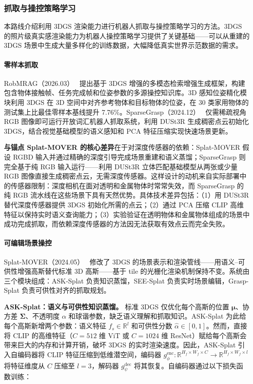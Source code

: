 \subsubsection{抓取与操控策略学习}

本路线介绍利用 3DGS 渲染能力进行机器人抓取与操控策略学习的方法。3DGS 的照片级真实感渲染能力为机器人操控策略学习提供了关键基础——可以从重建的 3DGS 场景中生成大量多样化的训练数据，大幅降低真实世界示范数据的需求。

\paragraph{零样本抓取}

RobMRAG（2026.03）~\cite{2603_00500} 提出基于 3DGS 增强的多模态检索增强生成框架，构建包含物体接触帧、任务完成帧和位姿参数的多源操控知识库。3D 感知位姿精化模块利用 3DGS 在 3D 空间中对齐参考物体和目标物体的位姿，在 30 类家用物体的测试集上比最佳零样本基线提升 7.76\%。SparseGrasp（2024.12）~\cite{2412_02140} 仅需稀疏视角 RGB 图像即可运行开放词汇机器人抓取系统，利用 DUSt3R 生成稠密点云初始化 3DGS，结合视觉基础模型的语义感知和 PCA 特征压缩实现快速场景更新。

\textbf{与锚点 Splat-MOVER 的核心差异}在于对深度传感器的依赖：Splat-MOVER 假设 RGBD 输入并通过精确的深度引导完成场景重建和语义蒸馏；SparseGrasp 则完全基于纯 RGB 输入运行——利用 DUSt3R 立体匹配基础模型从两张或少量 RGB 图像直接生成稠密点云，无需深度传感器。这样设计的动机来自实际部署中的传感器限制：深度相机在面对透明和金属物体时常常失效，而 SparseGrasp 的纯 RGB 流水线在这些场景下具有天然优势。具体技术差异包括：（1）用 DUSt3R 替代深度传感器提供 3DGS 初始化所需的点云；（2）通过 PCA 压缩 CLIP 高维特征以保持实时语义查询能力；（3）实验验证在透明物体和金属物体组成的场景中成功完成抓取，而依赖深度传感器的方法因无法获取有效点云而完全失败。

\paragraph{可编辑场景操控}

Splat-MOVER（2024.05）~\cite{2405_04378} 修改了 3DGS 的场景表示和渲染管线——用语义--可供性增强高斯替代标准 3D 高斯——基于 tile 的光栅化渲染机制保持不变。系统由三个模块组成：ASK-Splat 负责知识蒸馏，SEE-Splat 负责实时场景编辑，Grasp-Splat 负责可供性对齐的抓取规划。

\textbf{ASK-Splat：语义与可供性知识蒸馏。}
标准 3DGS 仅优化每个高斯的位置 $\boldsymbol{\mu}$、协方差 $\boldsymbol{\Sigma}$、不透明度 $\alpha$ 和球谐参数，缺乏语义理解和抓取知识。ASK-Splat 为此给每个高斯新增两个参数：语义特征 $f_s \in \mathbb{R}^l$ 和可供性分数 $\hat{\alpha} \in [0,1]$。然而，直接将 CLIP 的高维特征（$C=512$ 维 ViT 或 $C=1024$ 维 ResNet）赋给每个高斯会带来巨大的内存和计算开销，破坏 3DGS 的实时渲染速度。因此，ASK-Splat 引入自编码器将 CLIP 特征压缩到低维潜空间，编码器 $g_\phi^{\text{enc}}: \mathbb{R}^{H_f \times W_f \times C} \to \mathbb{R}^{H_f \times W_f \times l}$ 将特征维度从 $C$ 压缩至 $l = 3$，解码器 $g_\psi^{\text{dec}}$ 将其恢复。自编码器通过以下损失函数训练：

